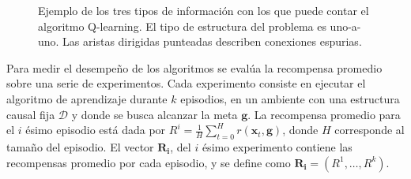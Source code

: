 \begin{figure}
  \centering
  \qquad
    \qquad
  \caption{Ejemplo de los tres tipos de información con los que puede  contar el algoritmo Q-learning. El tipo de estructura
  del problema es uno-a-uno. Las aristas dirigidas punteadas describen conexiones espurias.}
  \label{fig:types-info-dag}
\end{figure}

Para medir el desempeño de los algoritmos se evalúa la recompensa
promedio sobre una serie de experimentos.
Cada experimento consiste en ejecutar el algoritmo de aprendizaje durante $k$ episodios, en 
un ambiente con una estructura causal fija $\mathcal{D}$ y donde se busca alcanzar la meta $\mathbf{g}$.
La recompensa promedio para el $i$ ésimo episodio está dada por
$R^{i} = \frac{1}{H}\sum_{t=0}^H r(\mathbf{x}_t, \mathbf{g})$,
donde $H$ corresponde al tamaño del episodio.
El vector $\mathbf{R_i}$, del $i$ ésimo experimento contiene las recompensas promedio por cada episodio, y se define como
$\mathbf{R_i} = (R^{1}, \dots, R^k)$.

